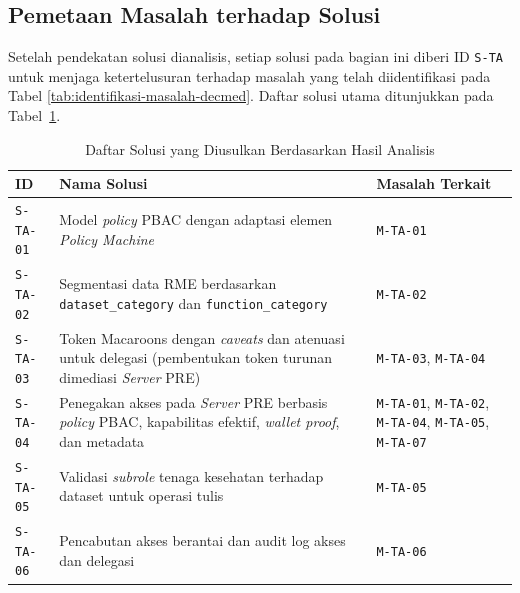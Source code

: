 \subsection{Pemetaan Masalah terhadap Solusi}
\label{subsec:pemetaan-kebutuhan-solusi}
\label{subsec:pemetaan-masalah-solusi}

Setelah pendekatan solusi dianalisis, setiap solusi pada bagian ini diberi ID \texttt{S-TA} untuk menjaga ketertelusuran terhadap masalah yang telah diidentifikasi pada Tabel \ref{tab:identifikasi-masalah-decmed}. Daftar solusi utama ditunjukkan pada Tabel~\ref{tab:daftar-solusi-ta}.

\begin{table}[H]
	\centering
	\caption{Daftar Solusi yang Diusulkan Berdasarkan Hasil Analisis}
	\label{tab:daftar-solusi-ta}
	\small
	\begin{tabular}{|p{}|p{}|p{}|}
		\hline
		\textbf{ID}      & \textbf{Nama Solusi}                                                                                                             & \textbf{Masalah Terkait}                                                                 \\ \hline
		\texttt{S-TA-01} & Model \textit{policy} PBAC dengan adaptasi elemen \textit{Policy Machine}                                                        & \texttt{M-TA-01}                                                                         \\ \hline
		\texttt{S-TA-02} & Segmentasi data RME berdasarkan \texttt{dataset\_category} dan \texttt{function\_category}                                       & \texttt{M-TA-02}                                                                         \\ \hline
		\texttt{S-TA-03} & Token Macaroons dengan \textit{caveats} dan atenuasi untuk delegasi (pembentukan token turunan dimediasi \textit{Server} PRE)    & \texttt{M-TA-03}, \texttt{M-TA-04}                                                       \\ \hline
		\texttt{S-TA-04} & Penegakan akses pada \textit{Server} PRE berbasis \textit{policy} PBAC, kapabilitas efektif, \textit{wallet proof}, dan metadata & \texttt{M-TA-01}, \texttt{M-TA-02}, \texttt{M-TA-04}, \texttt{M-TA-05}, \texttt{M-TA-07} \\ \hline
		\texttt{S-TA-05} & Validasi \textit{subrole} tenaga kesehatan terhadap dataset untuk operasi tulis                                                  & \texttt{M-TA-05}                                                                         \\ \hline
		\texttt{S-TA-06} & Pencabutan akses berantai dan audit log akses dan delegasi                                                                       & \texttt{M-TA-06}                                                                         \\ \hline
	\end{tabular}
\end{table}

